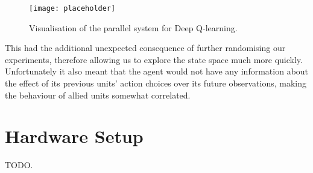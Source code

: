 \begin{figure}[h]
    \centering
    \texttt{[image: placeholder]}
    \caption{Visualisation of the parallel system for Deep Q-learning.}
    \label{fig:paralleldq}
\end{figure}

This had the additional unexpected consequence of further randomising our
experiments, therefore allowing us to explore the state space much more quickly.
Unfortunately it also meant that the agent would not have any information about
the effect of its previous units' action choices over its future observations,
making the behaviour of allied units somewhat correlated.


\section{Hardware Setup}

TODO.